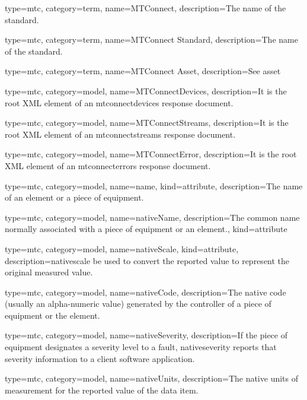 {
  type=mtc,
  category=term,
  name={MTConnect},
  description={The name of the standard.}
}

{
  type=mtc,
  category=term,
  name={MTConnect Standard},
  description={The name of the standard.}
}

{
  type=mtc,
  category=term,
  name={MTConnect Asset},
  description={See \gls{asset}}
}


{
  type=mtc,
  category=model,
  name={MTConnectDevices},
  description={It is the root XML element of an \gls{mtconnectdevices response document}.}
}


{
  type=mtc,
  category=model,
  name={MTConnectStreams},
  description={It is the root XML element of an \gls{mtconnectstreams response document}.}
}

{
  type=mtc,
  category=model,
  name={MTConnectError},
  description={It is the root XML element of an \gls{mtconnecterrors response document}.}
}


{
  type=mtc,
  category=model,
  name={name},
  kind={attribute},
  description={The name of an element or a piece of equipment.}
}


{
  type=mtc,
  category=model,
  name={nativeName},
  description={The common name normally associated with a piece of equipment or an element.},
  kind={attribute}
}

{
  type=mtc,
  category=model,
  name={nativeScale},
  kind={attribute},
  description={\gls{nativescale} \MAY be used to convert the reported value to represent the original measured value.}
}


{
  type=mtc,
  category=model,
  name={nativeCode},
  description={The native code (usually an alpha-numeric value) generated by the controller of a piece of equipment or the element.}
}


{
  type=mtc,
  category=model,
  name={nativeSeverity},
  description={If the piece of equipment designates a severity level to a fault, \gls{nativeseverity} reports that severity information to a client software application. }
}


{
  type=mtc,
  category=model,
  name={nativeUnits},
  description={The native units of measurement for the reported value of the data item.}
}



